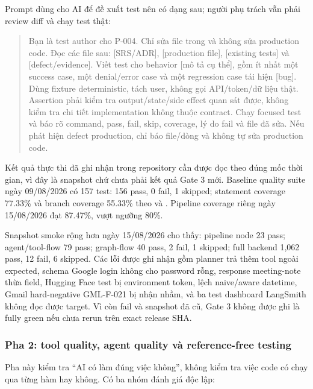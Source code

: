 \documentclass[12pt,a4paper]{article}
\begin{document}
Prompt dùng cho AI để đề xuất test nên có dạng sau; người phụ trách vẫn phải
review diff và chạy test thật:

\begin{quote}
Bạn là test author cho P-004. Chỉ sửa file trong  và không sửa
production code. Đọc các file sau: [SRS/ADR], [production file], [existing
tests] và [defect/evidence]. Viết test cho behavior [mô tả cụ thể], gồm ít nhất
một success case, một denial/error case và một regression case tái hiện
[bug]. Dùng fixture deterministic, tách user, không gọi API/token/dữ liệu thật.
Assertion phải kiểm tra output/state/side effect quan sát được, không kiểm tra
chi tiết implementation không thuộc contract. Chạy focused test và báo rõ
command, pass, fail, skip, coverage, lý do fail và file đã sửa. Nếu phát hiện
defect production, chỉ báo file/dòng và không tự sửa production code.
\end{quote}

Kết quả thực thi đã ghi nhận trong repository cần được đọc theo đúng mốc thời
gian, vì đây là snapshot chứ chưa phải kết quả Gate 3 mới. Baseline quality
suite ngày 09/08/2026 có 157 test: 156 pass, 0 fail, 1 skipped; statement
coverage 77.33\% và branch coverage 55.33\% theo
 và . Pipeline
coverage riêng ngày 15/08/2026 đạt 87.47\%, vượt ngưỡng 80\%.

Snapshot smoke rộng hơn ngày 15/08/2026 cho thấy: pipeline node 23 pass;
agent/tool-flow 79 pass; graph-flow 40 pass, 2 fail, 1 skipped; full backend
1,062 pass, 12 fail, 6 skipped. Các lỗi được ghi nhận gồm planner trả thêm
tool ngoài expected, schema Google login không cho password rỗng, response
meeting-note thừa field, Hugging Face test bị environment token, lệch
naive/aware datetime, Gmail hard-negative GML-F-021 bị nhận nhầm, và ba test
dashboard LangSmith không đọc được target. Vì còn fail và snapshot đã cũ,
Gate 3 không được ghi là fully green nếu chưa rerun trên exact release SHA.

\subsubsection{Pha 2: tool quality, agent quality và reference-free testing}
Pha này kiểm tra ``AI có làm đúng việc không'', không kiểm tra việc code có
chạy qua từng hàm hay không. Có ba nhóm đánh giá độc lập:
\end{document}
